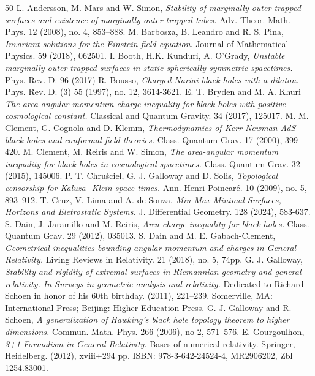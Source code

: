 \documentclass[a4paper, 11pt, reqno]{amsart}
\begin{document}
\begin{thebibliography}{50}
 L. Andersson, M. Mars and W. Simon, {\it Stability of marginally outer
trapped surfaces and existence of marginally outer trapped tubes.} Adv. Theor. Math. Phys. 12 (2008), no. 4, 853–888.
 M. Barbosza, B. Leandro and R. S. Pina, {\it Invariant solutions for the Einstein field equation}. Journal of Mathematical Physics. 59 (2018),  062501.
 I. Booth,  H.K. Kunduri, A. O’Grady, {\it Unstable marginally outer trapped surfaces in static spherically
symmetric spacetimes.} Phys. Rev. D. 96 (2017)
 R. Bousso, {\it Charged Nariai black holes with a dilaton.} Phys. Rev. D. (3) 55 (1997), no. 12, 3614-3621.
 E. T. Bryden and M. A. Khuri {\it The area-angular momentum-charge inequality for
black holes with positive cosmological constant.} Classical and Quantum Gravity. 34 (2017), 125017.
 M. M. Clement, G. Cognola and D. Klemm, {\it Thermodynamics of Kerr Newman-AdS black
holes and conformal field theories.}  Class. Quantum Grav. 17 (2000), 399--420.
 M. Clement, M. Reiris and W. Simon, {\it The area-angular momentum inequality for black holes
in cosmological spacetimes.} Class. Quantum Grav. 32 (2015), 145006.
 P. T. Chruściel, G. J. Galloway and D. Solis, {\it Topological censorship for Kaluza-
Klein space-times.} Ann. Henri Poincaré. 10 (2009), no. 5, 893–912.
 T. Cruz, V. Lima and A. de Souza, {\it Min-Max Minimal Surfaces, Horizons and Eletrostatic Systems.} J. Differential Geometry. 128 (2024), 583-637.
 S. Dain, J. Jaramillo and M. Reiris, {\it Area-charge inequality for black holes.} Class. Quantum
Grav. 29 (2012), 035013.
 S. Dain and M. E. Gabach-Clement, {\it Geometrical inequalities bounding angular
momentum and charges in General Relativity.} Living Reviews in Relativity. 21 (2018), no. 5, 74pp.
 G. J. Galloway, {\it  Stability and rigidity of extremal surfaces in Riemannian geometry
and general relativity. In Surveys in geometric analysis and relativity.} Dedicated to Richard
Schoen in honor of his 60th birthday. (2011), 221–239. Somerville, MA: International Press;
Beijing: Higher Education Press.
 G. J. Galloway and R. Schoen, {\it A generalization of Hawking’s black hole topology
theorem to higher dimensions.} Commun. Math. Phys. 266 (2006), no 2, 571–576. 
 E. Gourgoulhon, {\it 3+1 Formalism in General Relativity.} Bases of numerical
relativity. Springer, Heidelberg. (2012), xviii+294 pp. ISBN: 978-3-642-24524-4, MR2906202, Zbl 1254.83001.

\end{thebibliography}
\end{document}
